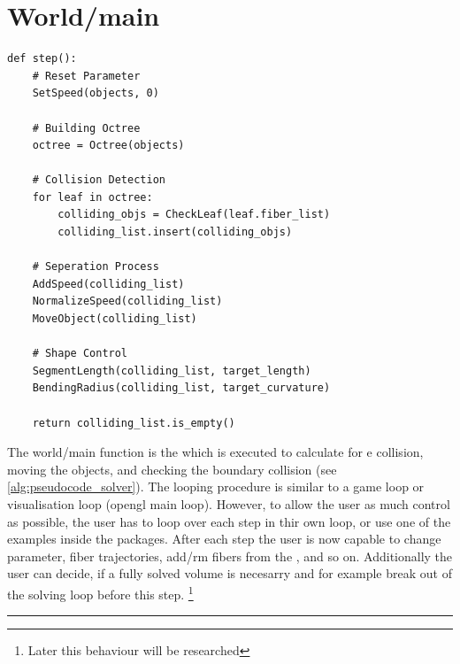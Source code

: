 \section{World/main}
% 
\begin{lstfloat}[!tb]
\lstset{style=python}
\begin{lstlisting}[]
def step():
    # Reset Parameter
    SetSpeed(objects, 0)
    
    # Building Octree
    octree = Octree(objects)
    
    # Collision Detection
    for leaf in octree:
        colliding_objs = CheckLeaf(leaf.fiber_list)
        colliding_list.insert(colliding_objs)
	
    # Seperation Process
    AddSpeed(colliding_list)
    NormalizeSpeed(colliding_list)
    MoveObject(colliding_list)
	
    # Shape Control
    SegmentLength(colliding_list, target_length)
    BendingRadius(colliding_list, target_curvature)

    return colliding_list.is_empty()
\end{lstlisting}
\caption{Pseudocode of the main algorithm: The function \texttt{FiberCollisionSolver} will loop the followings four steps, which are run in parallel, until no collision are detected anymore: 1. build an \texttt{octree} from all objects, 2. \texttt{Collision Detection}, 3. \texttt{Seperation Process} and 4. \texttt{Shape Control}.}
\label{alg:pseudocode_solver}
\end{lstfloat}

% 
The world/main function is the  which is executed to calculate for e collision, moving the objects, and checking the boundary collision (see \cref{alg:pseudocode_solver}).
The looping procedure is similar to a game loop or visualisation loop (\eg opengl main loop).
However, to allow the user as much control as possible, the user has to loop over each step in thir own loop, or use one of the examples inside the packages.
After each step the user is now capable to change parameter, fiber trajectories, add/rm fibers from the , and so on.
Additionally the user can decide, if a fully solved volume is necesarry and for example break out of the solving loop before this step. 
\footnote{Later this behaviour will be researched}
% 
% 
% 
\vspace{5pt}
\hrule
\vspace{6pt}
% 
\newpage
%
